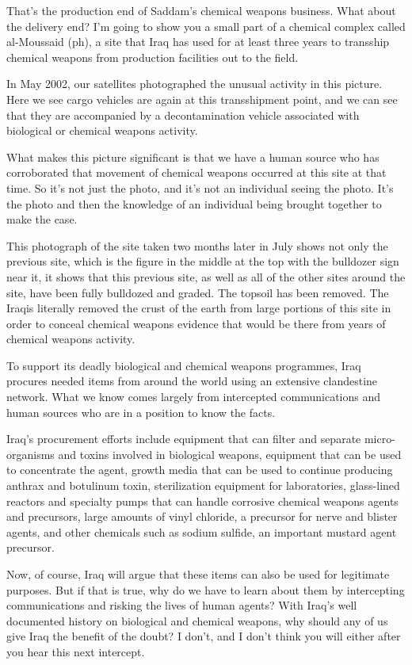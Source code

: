 \documentclass[10pt,a4paper]{article}
\begin{document}
That's the production end of Saddam's chemical weapons business. What about the delivery end? I'm going to show you a small part of a chemical complex called al-Moussaid (ph), a site that Iraq has used for at least three years to transship chemical weapons from production facilities out to the field.

In May 2002, our satellites photographed the unusual activity in this picture. Here we see cargo vehicles are again at this transshipment point, and we can see that they are accompanied by a decontamination vehicle associated with biological or chemical weapons activity.

What makes this picture significant is that we have a human source who has corroborated that movement of chemical weapons occurred at this site at that time. So it's not just the photo, and it's not an individual seeing the photo. It's the photo and then the knowledge of an individual being brought together to make the case.

This photograph of the site taken two months later in July shows not only the previous site, which is the figure in the middle at the top with the bulldozer sign near it, it shows that this previous site, as well as all of the other sites around the site, have been fully bulldozed and graded. The topsoil has been removed. The Iraqis literally removed the crust of the earth from large portions of this site in order to conceal chemical weapons evidence that would be there from years of chemical weapons activity.

To support its deadly biological and chemical weapons programmes, Iraq procures needed items from around the world using an extensive clandestine network. What we know comes largely from intercepted communications and human sources who are in a position to know the facts.

Iraq's procurement efforts include equipment that can filter and separate micro-organisms and toxins involved in biological weapons, equipment that can be used to concentrate the agent, growth media that can be used to continue producing anthrax and botulinum toxin, sterilization equipment for laboratories, glass-lined reactors and specialty pumps that can handle corrosive chemical weapons agents and precursors, large amounts of vinyl chloride, a precursor for nerve and blister agents, and other chemicals such as sodium sulfide, an important mustard agent precursor.

Now, of course, Iraq will argue that these items can also be used for legitimate purposes. But if that is true, why do we have to learn about them by intercepting communications and risking the lives of human agents? With Iraq's well documented history on biological and chemical weapons, why should any of us give Iraq the benefit of the doubt? I don't, and I don't think you will either after you hear this next intercept.
\end{document}
